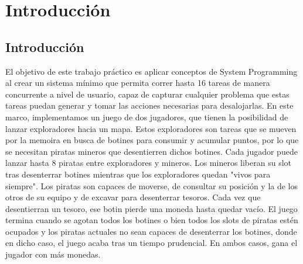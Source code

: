 \section{Introducción}
\subsection{Introducción}

El objetivo de este trabajo práctico es aplicar conceptos de System Programming al crear un sistema mínimo que permita correr hasta 16 tareas de manera concurrente a nivel de usuario, capaz de capturar cualquier problema que estas tareas puedan generar y tomar las acciones necesarias para desalojarlas.
En este marco, implementamos un juego de dos jugadores, que tienen la posibilidad de lanzar exploradores hacia un mapa. Estos exploradores son tareas que se mueven por la memoira en busca de botines para consumir y acumular puntos, por lo que se necesitan piratas mineros que desentierren dichos botines.
Cada jugador puede lanzar hasta 8 piratas entre exploradores y mineros. Los mineros liberan su slot tras desenterrar botines mientras que los exploradores quedan "vivos para siempre".
Los piratas son capaces de moverse, de consultar su posición y la de los otros de su equipo y de excavar para desenterrar tesoros. Cada vez que desentierran un tesoro, ese botin pierde una moneda hasta quedar vacío.
El juego termina cuando se agotan todos los botines o bien todos los slots de piratas estén ocupados y los piratas actuales no sean capaces de desenterrar los botines, donde en dicho caso, el juego acaba tras un tiempo prudencial. En ambos casos, gana el jugador con más monedas.